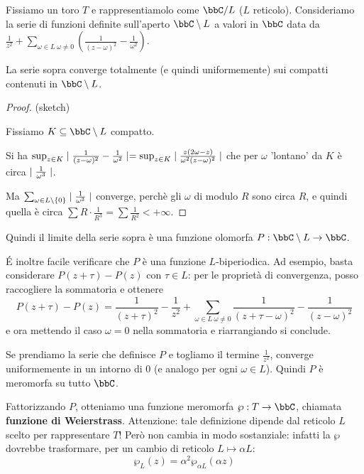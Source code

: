 Fissiamo un toro $T$ e rappresentiamolo come $\bbC/L$ ($L$ reticolo).
Consideriamo la serie di funzioni definite sull'aperto $\bbC\setminus L$ a valori in $\bbC$ data da $\frac{1}{z^2}+\sum_{\omega\in L\ \omega\not=0}(\frac{1}{(z-\omega)^2}-\frac{1}{\omega^2})$.

\begin{proposizione}
La serie sopra converge totalmente (e quindi uniformemente) sui compatti contenuti in $\bbC\setminus L$.
\end{proposizione}
\begin{proof}(sketch)

Fissiamo $K\subseteq\bbC\setminus L$ compatto.

Si ha $\sup_{z\in K}\mid \frac{1}{(z-\omega)^2}-\frac{1}{\omega^2} \mid=\sup_{z\in K}\mid \frac{z(2\omega-z)}{\omega^2(z-\omega)^2} \mid$ che per $\omega$ 'lontano' da $K$ è circa $\mid \frac{1}{\omega^3} \mid$.

Ma $\sum_{\omega\in L\setminus\{0\}}\mid \frac{1}{\omega^3} \mid$ converge, perchè
gli $\omega$ di modulo $R$ sono circa $R$, e quindi quella è circa $\sum R\cdot\frac{1}{R^3}=\sum\frac{1}{R^2}<+\infty$.
\end{proof}

Quindi il limite della serie sopra è una funzione olomorfa $P:\bbC\setminus L\rar\bbC$.

\'E inoltre facile verificare che $P$ è una funzione $L$-biperiodica.
Ad esempio, basta considerare $P(z+\tau)-P(z)$ con $\tau \in L$: per le proprietà di convergenza, posso raccogliere la sommatoria e ottenere
\[ P(z+\tau) - P(z) = \frac1{(z+\tau)^2} - \frac1{z^2} + \sum_{\omega \in L\ \omega\ne 0} \frac1{(z+\tau-\omega)^2}-\frac1{(z-\omega)^2}\]
e ora mettendo il caso $\omega=0$ nella sommatoria e riarrangiando si conclude.

Se prendiamo la serie che definisce $P$ e togliamo il termine $\frac{1}{z^2}$, converge uniformemente in un intorno di $0$ (e analogo per ogni $\omega\in L$).
Quindi $P$ è meromorfa su tutto $\bbC$.

Fattorizzando $P$, otteniamo una funzione meromorfa $\wp:T\rar\bbC$, chiamata \textbf{funzione di Weierstrass}. Attenzione: tale definizione dipende dal reticolo $L$ scelto per rappresentare $T$! Però non cambia in modo sostanziale: infatti la $\wp$ dovrebbe trasformare, per un cambio di reticolo $L \mapsto \alpha L$:
\[
 \wp_L(z) = \alpha^2 \wp_{\alpha L}(\alpha z) 
\]

